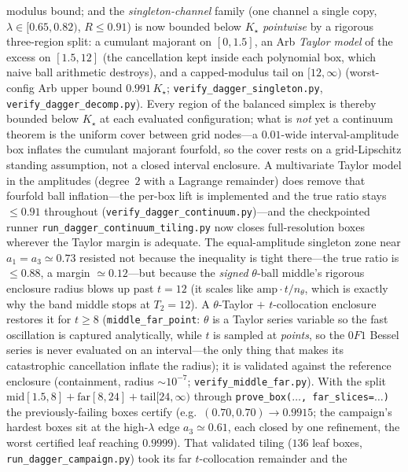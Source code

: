 modulus bound; and the \emph{singleton-channel} family (one channel a single copy, $\lambda\in[0.65,0.82)$,
$R\le0.91$) is now bounded below $K_\star$ \emph{pointwise} by a rigorous three-region split: a cumulant
majorant on $[0,1.5]$, an Arb \emph{Taylor model} of the excess on $[1.5,12]$ (the cancellation kept inside
each polynomial box, which naive ball arithmetic destroys), and a capped-modulus tail on $[12,\infty)$
(worst-config Arb upper bound $0.991\,K_\star$; \texttt{verify\_dagger\_singleton.py},
\texttt{verify\_dagger\_decomp.py}). Every region of the balanced simplex is thereby bounded below $K_\star$ at
each evaluated configuration; what is \emph{not} yet a continuum theorem is the uniform cover between grid
nodes---a $0.01$-wide interval-amplitude box inflates the cumulant majorant fourfold, so the cover rests on a
grid-Lipschitz standing assumption, not a closed interval enclosure. A multivariate Taylor model in the
amplitudes (degree~$2$ with a Lagrange remainder) does remove that fourfold ball inflation---the per-box lift
is implemented and the true ratio stays $\le0.91$ throughout (\texttt{verify\_dagger\_continuum.py})---and the
checkpointed runner \texttt{run\_dagger\_continuum\_tiling.py} now closes full-resolution boxes wherever the
Taylor margin is adequate. The equal-amplitude singleton zone near $a_1=a_3\simeq0.73$ resisted not because
the inequality is tight there---the true ratio is $\le0.88$, a margin $\simeq0.12$---but because the
\emph{signed} $\theta$-ball middle's rigorous enclosure radius blows up past $t=12$ (it scales like
$\mathrm{amp}\cdot t/n_\theta$, which is exactly why the band middle stops at $T_2=12$). A $\theta$-Taylor
$+$ $t$-collocation enclosure restores it for $t\ge8$ (\texttt{middle\_far\_point}: $\theta$ is a Taylor
series variable so the fast oscillation is captured analytically, while $t$ is sampled at \emph{points}, so
the $0F1$ Bessel series is never evaluated on an interval---the only thing that makes its catastrophic
cancellation inflate the radius); it is validated against the reference enclosure (containment, radius
$\sim10^{-7}$; \texttt{verify\_middle\_far.py}). With the split $\mathrm{mid}[1.5,8]+\mathrm{far}[8,24]+\mathrm{tail}[24,\infty)$
through \texttt{prove\_box($\dots$,\,far\_slices=$\dots$)} the previously-failing boxes certify
(e.g.\ $(0.70,0.70)\to0.9915$; the campaign's hardest boxes sit at the high-$\lambda$ edge
$a_3\simeq0.61$, each closed by one refinement, the worst certified leaf reaching $0.9999$). That validated
tiling ($136$ leaf boxes, \texttt{run\_dagger\_campaign.py}) took its far $t$-collocation remainder and the
